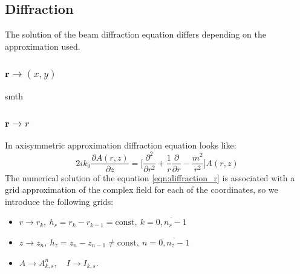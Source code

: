 \documentclass[a4paper, 12pt]{article}
\begin{document}
\subsection{Diffraction}
The solution of the beam diffraction equation differs depending on the approximation used.

\subsubsection{$\mathbf{r}\longrightarrow(x,y)$}

smth

\subsubsection{$\mathbf{r}\longrightarrow r$}
In axisymmetric approximation diffraction equation looks like:
\begin{equation}
\label{eqn:diffraction_r}
2 i k_0 \frac{\partial A (r, z)}{\partial z} = \biggl[ \frac{\partial^2}{\partial r^2} + \frac1{r}\frac{\partial}{\partial r} - \frac{m^2}{r^2} \biggr] A(r,z)
\end{equation}
The numerical solution of the equation \eqref{eqn:diffraction_r} is associated with a grid approximation of the complex field for each of the coordinates, so we introduce the following grids:
\begin{itemize}
\item $r\longrightarrow r_k, \ h_r = r_k - r_{k-1} = \text{const}, \ k = \overline{0, n_r-1}$
\item $z\longrightarrow z_n, \ h_z = z_n - z_{n-1} \ne \text{const}, \ n = \overline{0, n_z-1}$
\item $A \longrightarrow A^n_{k, s}, \quad I \longrightarrow I_{k,s}$.
\end{itemize}
\end{document}
